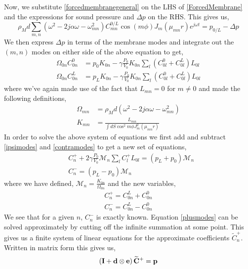 \documentclass[a4paper,10pt]{article}
\begin{document}
Now, we substitute \eqref{forcedmembranegeneral} on the LHS of \eqref{ForcedMembrane} and the expressions
for sound pressure and $\Delta p$ on the RHS. This gives us,
\begin{equation}
 \rho_Md\sum_{m,n}\left(\omega^2-2j\alpha\omega-\omega^2_{mn}\right)C^{0/L}_{mn}\cos(m\phi)J_m(\mu_{mn}r)e^{j\omega t}=p_{0/L}-\Delta p
\end{equation}
We then express $\Delta p$ in terms of the membrane modes and integrate out the $(m,n)$ modes on either
side of the above equation to get,
\begin{align}
 \Omega_{0n}C^{0}_{0n}&=p_{0}K_{0n}-\gamma\frac{P_0}{V_0}K_{0n}\sum_{l}\left(C^0_{0l}+C^L_{0l}\right)L_{0l}\label{ipsimodes}\\
 \Omega_{0n}C^{L}_{0n}&=p_{L}K_{0n}-\gamma\frac{P_0}{V_0}K_{0n}\sum_{l}\left(C^0_{0l}+C^L_{0l}\right)L_{0l}\label{contramodes}
\end{align}
where we've again made use of the fact that $L_{mn}=0$ for $m\neq 0$ and made the following definitions,
\begin{align}
 \Omega_{mn}&=\rho_Md\left(\omega^2-2j\alpha\omega-\omega^2_{mn}\right)\\
 K_{mn}&=\frac{L_{mn}}{\int dS\cos^2 m\phi J^2_m(\mu_{mn}r)}
\end{align}
In order to solve the above system of equations we first add and subtract \eqref{ipsimodes} and \eqref{contramodes}
to get a new set of equations,
\begin{align}
&C^+_n+2\gamma\frac{P_0}{V_0}\mathcal{M}_n\sum_{l}C^+_lL_{0l}=(p_L+p_0)\mathcal{M}_n\label{plusmodes}\\
&C^-_n=(p_L-p_0)\mathcal{M}_n\label{minusmodes}
\end{align} 
where we have defined, $\mathcal{M}_n=\frac{K_{0n}}{\Omega_{0n}}$ and the new variables,
\begin{align}
 C^+_n=C^L_{0n}+C^0_{0n}\\
 C^-_n=C^L_{0n}-C^0_{0n}
\end{align}
We see that for a given $n$, $C^-_n$ is exactly known. Equation \eqref{plusmodes} can be solved approximately by cutting off the infinite summation at some point.
This gives us a finite system of linear equations for the approximate coefficients $\widetilde{C}^+_n$. Written
in matrix form this gives us,
\begin{equation}\label{plusapprox}
 \left(\mathbf{I}+\mathbf{d\otimes e}\right)\widetilde{\mathbf{C}}^+=\mathbf{p}\\
\end{equation}
\end{document}
